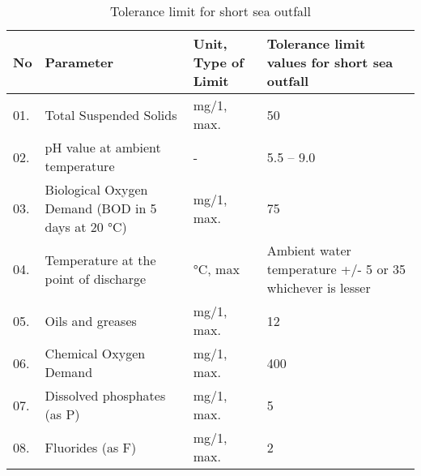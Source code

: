 \begin{table}[H]
\caption{Tolerance limit for short sea outfall}
\centering
\begin{tabular}{|p{0.5cm}|p{6cm}|p{3.5cm}|p{4cm}|} \hline
No & Parameter & Unit, Type of Limit & Tolerance limit values for short sea outfall \\ \hline
01. & Total Suspended Solids  & mg/1, max. & 50 \\ \hline
02. & pH value at ambient temperature & - & 5.5 – 9.0 \\ \hline
03. & Biological Oxygen Demand (BOD in 5 days at 20 °C) & mg/1, max. & 75 \\ \hline
04. & Temperature at the point of discharge & °C, max & Ambient water temperature +/- 5 or 35 whichever is lesser \\ \hline
05. & Oils and greases & mg/1, max. & 12  \\ \hline
06. & Chemical Oxygen Demand  & mg/1, max. & 400  \\ \hline
07. & Dissolved phosphates (as P) & mg/1, max. & 5  \\ \hline
08. & Fluorides (as F) & mg/1, max. & 2  \\ \hline
\end{tabular}
\label{table:tolerance_limit_details}
\end{table}